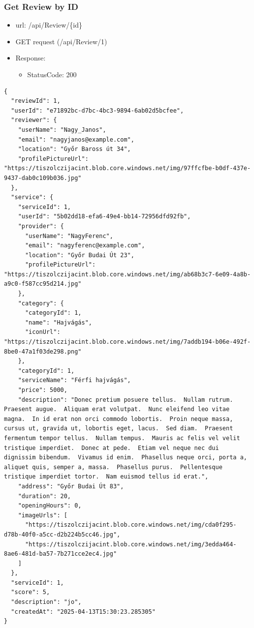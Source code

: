 \documentclass[11pt]{article}
\begin{document}
\subsubsection{Get Review by ID}
\label{sec:org73a96c7}
\begin{itemize}
\item url: /api/Review/\{id\}
\item GET request (/api/Review/1)
\item Response:
\begin{itemize}
\item StatusCode: 200
\end{itemize}
\end{itemize}
\begin{verbatim}
{
  "reviewId": 1,
  "userId": "e71892bc-d7bc-4bc3-9894-6ab02d5bcfee",
  "reviewer": {
    "userName": "Nagy_Janos",
    "email": "nagyjanos@example.com",
    "location": "Győr Baross út 34",
    "profilePictureUrl": "https://tiszolczijacint.blob.core.windows.net/img/97ffcfbe-b0df-437e-9437-dab0c109b036.jpg"
  },
  "service": {
    "serviceId": 1,
    "userId": "5b02dd18-efa6-49e4-bb14-72956dfd92fb",
    "provider": {
      "userName": "NagyFerenc",
      "email": "nagyferenc@example.com",
      "location": "Győr Budai Út 23",
      "profilePictureUrl": "https://tiszolczijacint.blob.core.windows.net/img/ab68b3c7-6e09-4a8b-a9c0-f587cc95d214.jpg"
    },
    "category": {
      "categoryId": 1,
      "name": "Hajvágás",
      "iconUrl": "https://tiszolczijacint.blob.core.windows.net/img/7addb194-b06e-492f-8be0-47a1f03de298.png"
    },
    "categoryId": 1,
    "serviceName": "Férfi hajvágás",
    "price": 5000,
    "description": "Donec pretium posuere tellus.  Nullam rutrum.  Praesent augue.  Aliquam erat volutpat.  Nunc eleifend leo vitae magna.  In id erat non orci commodo lobortis.  Proin neque massa, cursus ut, gravida ut, lobortis eget, lacus.  Sed diam.  Praesent fermentum tempor tellus.  Nullam tempus.  Mauris ac felis vel velit tristique imperdiet.  Donec at pede.  Etiam vel neque nec dui dignissim bibendum.  Vivamus id enim.  Phasellus neque orci, porta a, aliquet quis, semper a, massa.  Phasellus purus.  Pellentesque tristique imperdiet tortor.  Nam euismod tellus id erat.",
    "address": "Győr Budai Út 83",
    "duration": 20,
    "openingHours": 0,
    "imageUrls": [
      "https://tiszolczijacint.blob.core.windows.net/img/cda0f295-d78b-40f0-a5cc-d2b224b5cc46.jpg",
      "https://tiszolczijacint.blob.core.windows.net/img/3edda464-8ae6-481d-ba57-7b271cce2ec4.jpg"
    ]
  },
  "serviceId": 1,
  "score": 5,
  "description": "jo",
  "createdAt": "2025-04-13T15:30:23.285305"
}
\end{verbatim}
\end{document}
